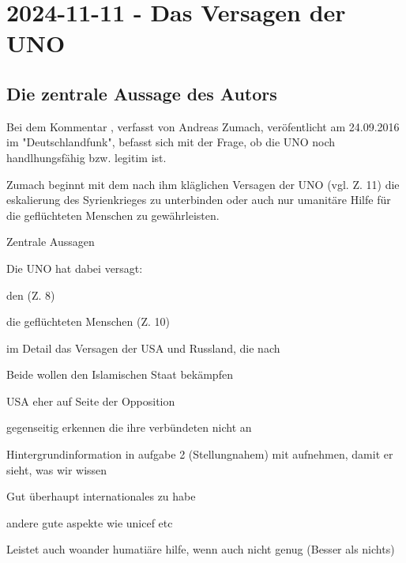 \section{2024-11-11 - Das Versagen der UNO}

\subsection{Die zentrale Aussage des Autors}

Bei dem Kommentar , verfasst von
Andreas Zumach, veröfentlicht am 24.09.2016 im "Deutschlandfunk", befasst sich
mit der Frage, ob die UNO noch handlhungsfähig bzw. legitim ist.

Zumach beginnt mit dem nach ihm kläglichen Versagen der UNO (vgl. Z. 11) die
eskalierung des Syrienkrieges zu unterbinden oder auch nur umanitäre Hilfe für
die geflüchteten Menschen zu gewährleisten.

Zentrale Aussagen
\startitemize[packed]
\item Die UNO hat dabei versagt:
\startitemize[packed]
\item den  (Z. 8)
\item die geflüchteten Menschen  (Z. 10)
\stopitemize
\item im Detail das Versagen der USA und Russland, die nach 
\startitemize[packed]
\item Beide wollen den Islamischen Staat bekämpfen
\item USA eher auf Seite der Opposition
\item gegenseitig erkennen die ihre verbündeten nicht an
\stopitemize
\stopitemize


\startframedtipp
Hintergrundinformation in aufgabe 2 (Stellungnahem) mit aufnehmen, damit er sieht, was wir wissen

\startitemize[packed]
\item Gut überhaupt internationales zu habe
\item andere gute aspekte wie unicef etc
\item Leistet auch woander humatiäre hilfe, wenn auch nicht genug (Besser als nichts)
\stopitemize
\stopframedtipp
